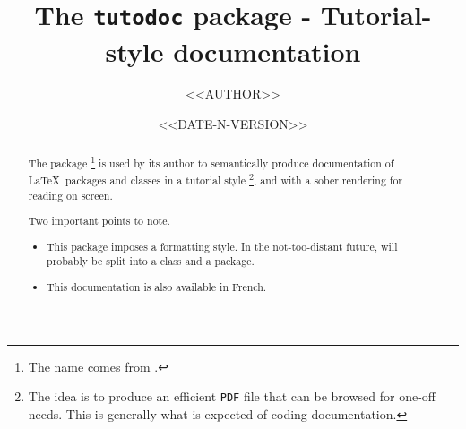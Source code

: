 \documentclass[10pt, a4paper]{article}
\begin{document}
\title{The \texttt{tutodoc} package - Tutorial-style documentation}
\author{<<AUTHOR>>}
\date{<<DATE-N-VERSION>>}

\maketitle

\begin{abstract}
    The  package
    \footnote{
        The name comes from .
    }
    is used by its author to semantically produce documentation of \LaTeX\ packages and classes in a tutorial style
    \footnote{
        The idea is to produce an efficient \texttt{PDF} file that can be browsed for one-off needs. This is generally what is expected of coding documentation.
    },
    and with a sober rendering for reading on screen.
    
    \medskip
    
    Two important points to note.
    \begin{itemize}
        \item This package imposes a formatting style. In the not-too-distant future,  will probably be split into a class and a package.
    
        \item This documentation is also available in French.
    \end{itemize}
\end{abstract}
\end{document}
